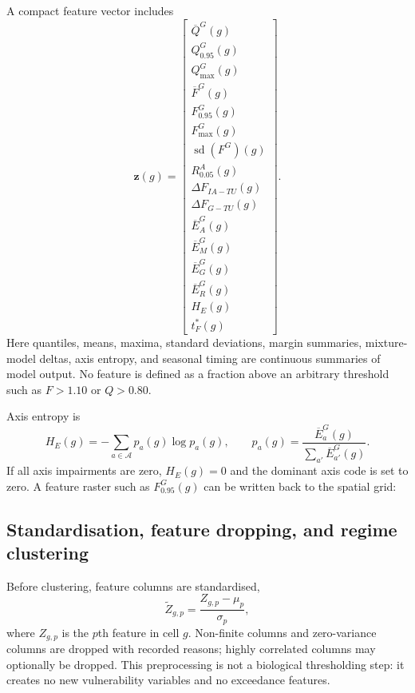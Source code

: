 A compact feature vector includes
\begin{equation}
\bm z(g)=
\begin{bmatrix}
\overline{Q}^{G}(g)\\
Q_{0.95}^{G}(g)\\
Q_{\max}^{G}(g)\\
\overline{F}^{G}(g)\\
F_{0.95}^{G}(g)\\
F_{\max}^{G}(g)\\
\operatorname{sd}(F^G)(g)\\
R^A_{0.05}(g)\\
\Delta F_{IA-TU}(g)\\
\Delta F_{G-TU}(g)\\
\overline{E}_{A}^{G}(g)\\
\overline{E}_{M}^{G}(g)\\
\overline{E}_{G}^{G}(g)\\
\overline{E}_{R}^{G}(g)\\
H_E(g)\\
t^*_F(g)
\end{bmatrix}.
\end{equation}
Here quantiles, means, maxima, standard deviations, margin summaries, mixture-model deltas, axis entropy, and seasonal timing are continuous summaries of model output. No feature is defined as a fraction above an arbitrary threshold such as $F>1.10$ or $Q>0.80$.

Axis entropy is
\begin{equation}
  H_E(g)=-\sum_{a\in\mathcal{A}}p_a(g)\log p_a(g),
  \qquad
  p_a(g)=\frac{\overline{E}_a^G(g)}{\sum_{a'}\overline{E}_{a'}^G(g)}.
\end{equation}
If all axis impairments are zero, $H_E(g)=0$ and the dominant axis code is set to zero. A feature raster such as $F_{0.95}^{G}(g)$ can be written back to the spatial grid:

\begin{center}
\drawRasterFeature
\end{center}

\subsection{Standardisation, feature dropping, and regime clustering}

Before clustering, feature columns are standardised,
\begin{equation}
  \widetilde{Z}_{g,p}=\frac{Z_{g,p}-\mu_p}{\sigma_p},
\end{equation}
where $Z_{g,p}$ is the $p$th feature in cell $g$. Non-finite columns and zero-variance columns are dropped with recorded reasons; highly correlated columns may optionally be dropped. This preprocessing is not a biological thresholding step: it creates no new vulnerability variables and no exceedance features.

